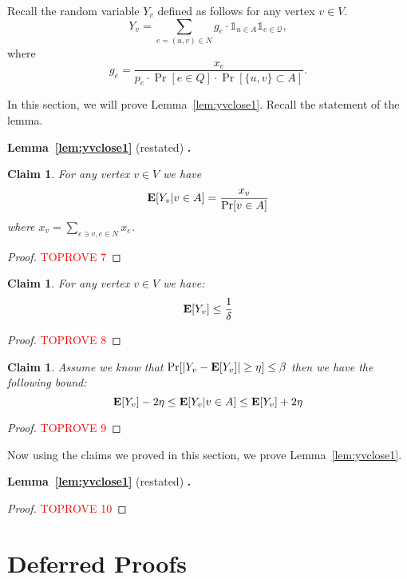 \documentclass[letterpaper,11pt]{article}
\DeclareMathOperator{\E}{\ensuremath{\normalfont \textbf{E}}}
\newtheorem{claim}[lemma]{Claim}
\newcommand{\restatelem}[2]{\noindent \textbf{Lemma~#1} (restated) \textbf{.} {\em #2}}
\begin{document}
Recall the random variable $Y_v$ defined as follows for any vertex $v\in V$.
$$Y_v = \sum_{e=(u,v) \in N} g_{e} \cdot\mathds{1}_{u\in A}  \mathds{1}_{e\in \mathcal{Q}},$$
where $$g_e=\frac{x_e}{p_e\cdot\Pr[e \in Q]\cdot\Pr[\{u, v\} \subset A]}.$$

In this section, we will prove Lemma~\ref{lem:yvclose1}. Recall the statement of the lemma.

\restatelem{\ref{lem:yvclose1}}{\lemyvaboutone{}}



\begin{claim}\label{claim:kjnrrfnj3r}
For any vertex $v\in V$ we have   $$\E[Y_v|v\in A] = \frac{x_v}{\Pr[v\in  A]}$$ where $x_v = \sum_{e \ni v, e \in N} x_e$.
\end{claim}
\begin{proof}\textcolor{red}{TOPROVE 7}\end{proof}

\begin{claim}\label{claim:expY}
     For any vertex $v\in  V$ we have:
     $$\E[Y_v]\leq \frac{1}{\delta}$$
\end{claim}
\begin{proof}\textcolor{red}{TOPROVE 8}\end{proof}

\begin{claim}\label{claim:YVconditionAdiff}
    Assume we know that 
    $\Pr[|Y_v - \E[Y_v]| \geq \eta] \leq \beta$
    then we have the following bound:
    $$
    \E[Y_v] - 2 \eta \leq \E[Y_v | v \in A] \leq \E[Y_v] + 2\eta
    $$
    
\end{claim}

\newcommand{\NOT}[1]{\ensuremath{\mathrlap{#1}\phantom{#1}}}

\begin{proof}\textcolor{red}{TOPROVE 9}\end{proof}
Now using the claims we proved in this section, we prove Lemma~\ref{lem:yvclose1}.

\restatelem{\ref{lem:yvclose1}}{\lemyvaboutone{}}
 


\begin{proof}\textcolor{red}{TOPROVE 10}\end{proof} \section{Deferred Proofs}\label{section:proofs}
\end{document}
